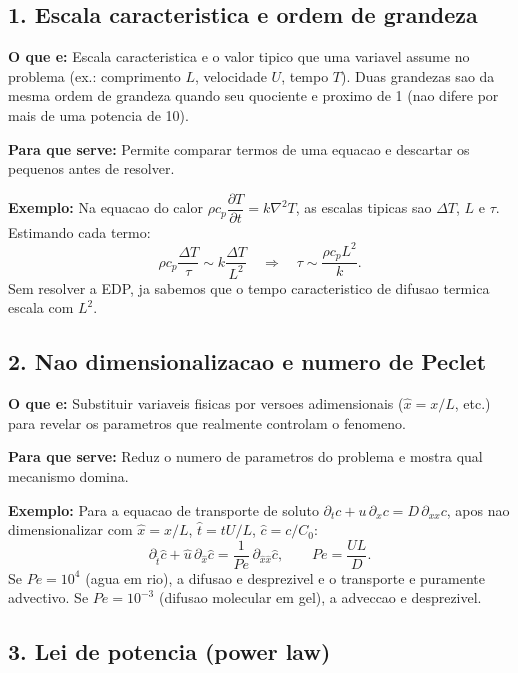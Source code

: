 \documentclass[12pt,a4paper,oneside]{book}
\theoremstyle{definition}
\begin{document}
\subsection*{1. Escala caracteristica e ordem de grandeza}

\textbf{O que e:}
Escala caracteristica e o valor tipico que uma variavel assume no problema
(ex.: comprimento $L$, velocidade $U$, tempo $T$).
Duas grandezas sao da mesma ordem de grandeza quando seu quociente e proximo de 1
(nao difere por mais de uma potencia de 10).

\textbf{Para que serve:}
Permite comparar termos de uma equacao e descartar os pequenos antes de resolver.

\textbf{Exemplo:}
Na equacao do calor
$\rho c_p \dfrac{\partial T}{\partial t} = k\nabla^2 T$,
as escalas tipicas sao $\Delta T$, $L$ e $\tau$.
Estimando cada termo:
\[
\rho c_p \frac{\Delta T}{\tau} \sim k\frac{\Delta T}{L^2}
\quad\Rightarrow\quad
\tau \sim \frac{\rho c_p L^2}{k}.
\]
Sem resolver a EDP, ja sabemos que o tempo caracteristico de difusao termica
escala com $L^2$.

\subsection*{2. Nao dimensionalizacao e numero de Peclet}

\textbf{O que e:}
Substituir variaveis fisicas por versoes adimensionais ($\hat{x}=x/L$, etc.)
para revelar os parametros que realmente controlam o fenomeno.

\textbf{Para que serve:}
Reduz o numero de parametros do problema e mostra qual mecanismo domina.

\textbf{Exemplo:}
Para a equacao de transporte de soluto
$\partial_t c + u\,\partial_x c = D\,\partial_{xx} c$,
apos nao dimensionalizar com $\hat{x}=x/L$, $\hat{t}=tU/L$, $\hat{c}=c/C_0$:
\[
\partial_{\hat{t}}\hat{c} + \hat{u}\,\partial_{\hat{x}}\hat{c}
= \frac{1}{Pe}\,\partial_{\hat{x}\hat{x}}\hat{c},
\qquad Pe = \frac{UL}{D}.
\]
Se $Pe = 10^4$ (agua em rio), a difusao e desprezivel e o transporte e puramente advectivo.
Se $Pe = 10^{-3}$ (difusao molecular em gel), a adveccao e desprezivel.

\subsection*{3. Lei de potencia (power law)}
\end{document}
